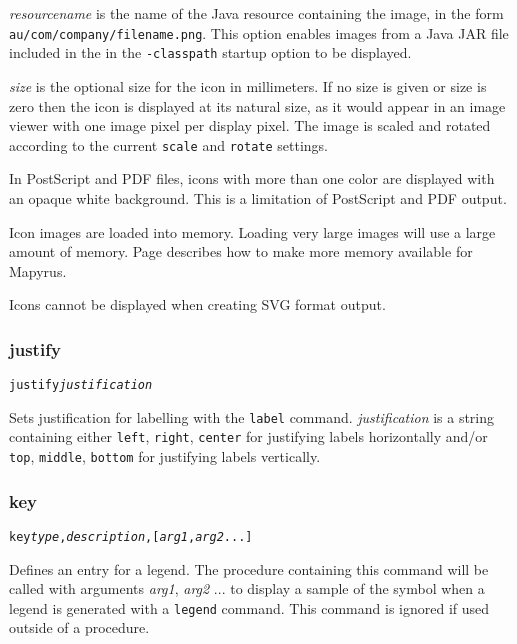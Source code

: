 \textit{resourcename} is the name of the Java resource containing the
image, in the form \texttt{au/com/company/filename.png}.
This option enables images from a Java JAR file included in the 
in the \texttt{-classpath} startup option to be displayed.

\textit{size} is the optional size for the icon in millimeters.  If no size
is given or size is zero then the icon is displayed at its natural size,
as it would appear in an image viewer with one image pixel per display
pixel.
The image is scaled and rotated according to the current \texttt{scale}
and \texttt{rotate} settings.

In PostScript and PDF files, icons with more than one color
are displayed with an opaque white background.  This is a limitation
of PostScript and PDF output.

Icon images are loaded into memory.
Loading very large images will use a large amount of memory.
Page \pageref{morememory} describes how to make more memory available
for Mapyrus.

Icons cannot be displayed when creating SVG format output.

\subsubsection{justify}

\begin{alltt}
justify \textit{justification}
\end{alltt}

Sets justification for labelling with the \texttt{label} command.
\textit{justification} is a string containing either
\texttt{left}, \texttt{right}, \texttt{center} for justifying labels
horizontally and/or
\texttt{top}, \texttt{middle}, \texttt{bottom} for justifying labels
vertically.

\subsubsection{key}

\begin{alltt}
key \textit{type}, \textit{description}, [\textit{arg1}, \textit{arg2} ...]
\end{alltt}

Defines an entry for a legend.  The procedure containing this command will be
called with arguments \textit{arg1}, \textit{arg2} ... to display a sample of
the symbol when a legend is generated with a \texttt{legend} command.  This
command is ignored if used outside of a procedure.

